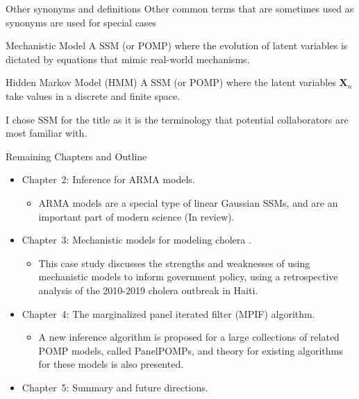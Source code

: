 \documentclass[aspectratio=169]{beamer}\usepackage[]{graphicx}\usepackage[]{xcolor}
\begin{document}
\begin{frame}{Other synonyms and definitions}
  Other common terms that are sometimes used as synonyms are used for special cases 
  \begin{block}{Mechanistic Model}
    A SSM (or POMP) where the evolution of latent variables is dictated by equations that mimic real-world mechanisms. 
  \end{block}
  
  \begin{block}{Hidden Markov Model (HMM)}
    A SSM (or POMP) where the latent variables $\bm{X}_n$ take values in a discrete and finite space.
  \end{block}

I chose SSM for the title as it is the terminology that potential collaborators are most familiar with.

\end{frame}

\begin{frame}{Remaining Chapters and Outline}
  \begin{itemize}
    \item \alert{Chapter~2:} Inference for $\mathrm{ARMA}$ models.
      \begin{itemize}
        \item $\mathrm{ARMA}$ models are a special type of linear Gaussian SSMs, and are an important part of modern science (In review). 
      \end{itemize}
    \item \alert{Chapter~3:} Mechanistic models for modeling cholera \citep{wheeler24}.
      \begin{itemize}
        \item This case study discusses the strengths and weaknesses of using mechanistic models to inform government policy, using a retrospective analysis of the 2010-2019 cholera outbreak in Haiti.
      \end{itemize}
    \item \alert{Chapter~4:} The marginalized panel iterated filter (MPIF) algorithm.
    \begin{itemize}
      \item A new inference algorithm is proposed for a large collections of related POMP models, called PanelPOMPs, and theory for existing algorithms for these models is also presented.
    \end{itemize}
    \item \alert{Chapter~5:} Summary and future directions.
  \end{itemize}
\end{frame}
\end{document}
